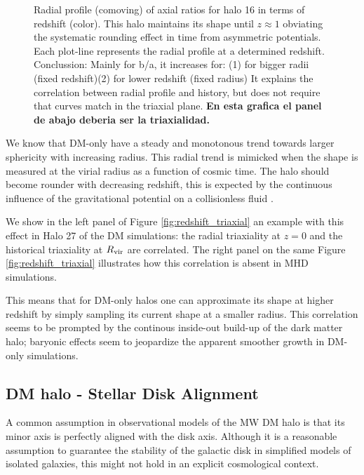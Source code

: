 \documentclass[a4paper,fleqn,usenatbib]{mnras}
\begin{document}
\begin{figure}
  \caption{Radial profile (comoving) of axial ratios for halo 16 in
    terms of redshift (color). This halo maintains its shape until
    $z\approx 1$ obviating the systematic rounding effect in time from
    asymmetric potentials. Each plot-line represents the radial
    profile at a determined redshift. Conclussion: Mainly for b/a, it increases for:
    (1) for bigger radii (fixed redshift)(2) for lower redshift (fixed
    radius) It explains the correlation between radial profile and
    history, but does not require that curves match in the triaxial
    plane. {\bf En esta grafica el panel de abajo deberia ser la triaxialidad.}}
  \label{fig:RedshiftGood}
\end{figure}

We know that DM-only have a steady and monotonous
trend towards larger sphericity with increasing radius. 
This radial trend is mimicked when the shape is measured at the virial
radius as a function of cosmic time.
The halo should become rounder with decreasing redshift, this is
expected by the continuous influence of the gravitational potential on
a collisionless fluid \citep{Vera-Ciro_et_al._2011}. 

We show in the left panel of Figure \ref{fig:redshift_triaxial} an
example with this effect in Halo 27 of the DM simulations:
the radial triaxiality at $z=0$ and the historical triaxiality at
$R_{\rm vir}$ are correlated. 
The right panel on the same Figure \ref{fig:redshift_triaxial}
illustrates how this correlation is absent in MHD simulations. 

This means that for DM-only halos one can approximate its shape at
higher redshift by simply sampling its 
current shape at a smaller radius. 
This correlation seems to be prompted by the continous inside-out
build-up of the dark matter halo; baryonic effects seem to jeopardize
the apparent smoother growth in DM-only simulations.



\subsection{DM halo - Stellar Disk Alignment}


A common assumption in observational models of the MW DM halo is that
its minor axis is perfectly aligned with the disk axis.
Although it is a reasonable assumption to guarantee the
stability of the galactic disk in simplified models of isolated
galaxies, this might not hold in an explicit cosmological context.
\end{document}

